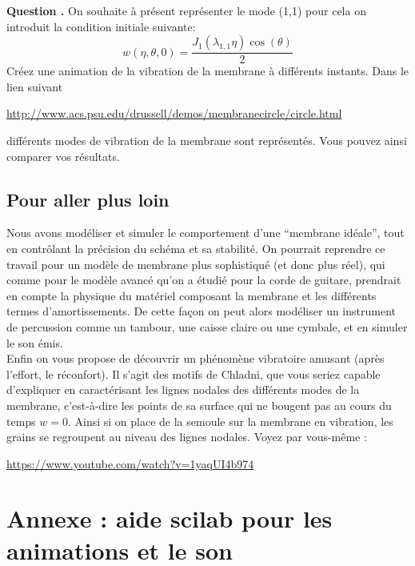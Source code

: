 \documentclass[a4,12pt]{article}
\newcounter{Nbquestion}
\newcommand*\question{%
\stepcounter{Nbquestion}%
\textbf{Question \theNbquestion. }}
\begin{document}
\begin{mdframed}[style=exampledefault]
\question On souhaite à présent représenter le mode (1,1) pour cela on introduit la condition initiale suivante:
\[
w(\eta,\theta,0)=\dfrac{J_1(\lambda_{1,1}\eta)\cos(\theta)}{2}
\]
Créez une animation de la vibration de la membrane à différents instants.
Dans le lien suivant 
\begin{center}
	\url{http://www.acs.psu.edu/drussell/demos/membranecircle/circle.html}
\end{center} 
différents modes de vibration de la membrane sont représentés.
Vous pouvez ainsi comparer  vos résultats.
\end{mdframed}

\subsection{Pour aller plus loin}

Nous avons modéliser et simuler le comportement d'une \enquote{membrane idéale}, tout en contrôlant la précision du schéma et sa stabilité. On pourrait reprendre ce travail pour un modèle de membrane plus sophistiqué (et donc plus réel), qui comme pour le modèle avancé qu'on a étudié pour la corde de guitare, prendrait en compte la physique du matériel composant la membrane et les différents termes d'amortissements. De cette façon on peut alors modéliser un instrument de percussion comme un tambour, une caisse claire ou une cymbale, et en simuler le son émis. \\

Enfin on vous propose de découvrir un phénomène vibratoire amusant (après l'effort, le réconfort). Il s'agit des motifs de Chladni, que vous seriez capable d'expliquer en caractérisant les lignes nodales des différents modes de la membrane, c'est-à-dire les points de sa surface qui ne bougent pas au cours du temps $w=0$. Ainsi si on place de la semoule sur la membrane en vibration, les grains se regroupent au niveau des lignes nodales. Voyez par vous-même :

\begin{center}
	\url{https://www.youtube.com/watch?v=1yaqUI4b974}
\end{center}

\newpage

\section*{Annexe : aide scilab pour les animations et le son}
\end{document}
